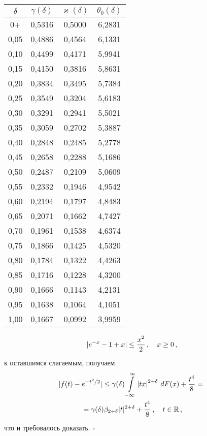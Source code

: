 \begin{multicols}{2}
{\small
\begin{center}
\tabcolsep=15pt
\begin{tabular}{|c|c|c|c|}
\hline
$\delta$ & $\gamma(\delta)$ & $\varkappa(\delta)$& $\theta_0(\delta)$  \\
\hline
 0+   & 0,5316 & 0,5000 & 6,2831  \\
 0,05 & 0,4886 & 0,4564 & 6,1331  \\
 0,10 & 0,4499 & 0,4171 & 5,9941  \\
 0,15 & 0,4150 & 0,3816 & 5,8631  \\
 0,20 & 0,3834 & 0,3495 & 5,7384  \\
 0,25 & 0,3549 & 0,3204 & 5,6183  \\
 0,30 & 0,3291 & 0,2941 & 5,5021  \\
 0,35 & 0,3059 & 0,2702 & 5,3887 \\
 0,40 & 0,2848 & 0,2485 & 5,2778 \\
 0,45 & 0,2658 & 0,2288 & 5,1686 \\
 0,50 & 0,2487 & 0,2109 & 5,0609 \\
 0,55 & 0,2332 & 0,1946 & 4,9542 \\
 0,60 & 0,2194 & 0,1797 & 4,8483 \\
 0,65 & 0,2071 & 0,1662 & 4,7427 \\
 0,70 & 0,1961 & 0,1538 & 4,6374 \\
 0,75 & 0,1866 & 0,1425 & 4,5320 \\
 0,80 & 0,1784 & 0,1322 & 4,4263 \\
 0,85 & 0,1716 & 0,1228 & 4,3200 \\
 0,90 & 0,1666 & 0,1143 & 4,2131 \\
 0,95 & 0,1638 & 0,1064 & 4,1051 \\
 1,00 & 0,1667 & 0,0992 & 3,9959 \\
\hline
\end{tabular}
\end{center}
\vspace*{4pt}

}


\bigskip
\addtocounter{table}{1}


$$
|e^{-x}-1+x|\le \displaystyle\frac{\displaystyle x^2\mathstrut}{\displaystyle 2\mathstrut}\,,\quad x\ge0\,,
$$
к оставшимся слагаемым, получаем
\begin{multline*}
|f(t)-e^{-t^2/2}|\le
\gamma(\delta)\int\limits_{-\infty}^\infty\left|tx\right|^{2+\delta}\,dF(x)+
\displaystyle\frac{\displaystyle t^4\mathstrut}{\displaystyle 8\mathstrut}={}\\
{}= \gamma(\delta)\beta_{2+\delta}|t|^{2+\delta}+\displaystyle\frac{\displaystyle t^4\mathstrut}{\displaystyle 8\mathstrut}\,,\quad t\in\mathbb R\,,
\end{multline*}
что и требовалось доказать. $\square$


\end{multicols}

